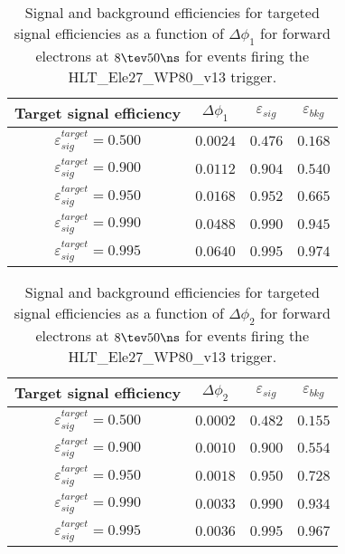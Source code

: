 \clearpage

\begin{table}[!bht]
  \begin{center}
    \begin{tabular}{cccc}
      \hline
      Target signal efficiency & $\Delta\phi_1$ & $\varepsilon_{sig}$ & $\varepsilon_{bkg}$ \\ 
      \hline
      $\varepsilon_{sig}^{target} = 0.500$ & $  0.0024$ & $0.476$ & $0.168$ \\
      $\varepsilon_{sig}^{target} = 0.900$ & $  0.0112$ & $0.904$ & $0.540$ \\
      $\varepsilon_{sig}^{target} = 0.950$ & $  0.0168$ & $0.952$ & $0.665$ \\
      $\varepsilon_{sig}^{target} = 0.990$ & $  0.0488$ & $0.990$ & $0.945$ \\
      $\varepsilon_{sig}^{target} = 0.995$ & $  0.0640$ & $0.995$ & $0.974$ \\
      \hline
    \end{tabular}
    \caption{Signal and background efficiencies for targeted signal efficiencies as a function of $\Delta\phi_1$ for forward electrons at $8\tev 50\ns$ for events firing the HLT\_Ele27\_WP80\_v13 trigger.}
    \label{tab:eff_rej_phi1_beam_8_50_trigger_27_F}
  \end{center}
\end{table}

\clearpage

\begin{table}[!bht]
  \begin{center}
    \begin{tabular}{cccc}
      \hline
      Target signal efficiency & $\Delta\phi_2$ & $\varepsilon_{sig}$ & $\varepsilon_{bkg}$ \\ 
      \hline
      $\varepsilon_{sig}^{target} = 0.500$ & $  0.0002$ & $0.482$ & $0.155$ \\
      $\varepsilon_{sig}^{target} = 0.900$ & $  0.0010$ & $0.900$ & $0.554$ \\
      $\varepsilon_{sig}^{target} = 0.950$ & $  0.0018$ & $0.950$ & $0.728$ \\
      $\varepsilon_{sig}^{target} = 0.990$ & $  0.0033$ & $0.990$ & $0.934$ \\
      $\varepsilon_{sig}^{target} = 0.995$ & $  0.0036$ & $0.995$ & $0.967$ \\
      \hline
    \end{tabular}
    \caption{Signal and background efficiencies for targeted signal efficiencies as a function of $\Delta\phi_2$ for forward electrons at $8\tev 50\ns$ for events firing the HLT\_Ele27\_WP80\_v13 trigger.}
    \label{tab:eff_rej_phi2_beam_8_50_trigger_27_F}
  \end{center}
\end{table}


